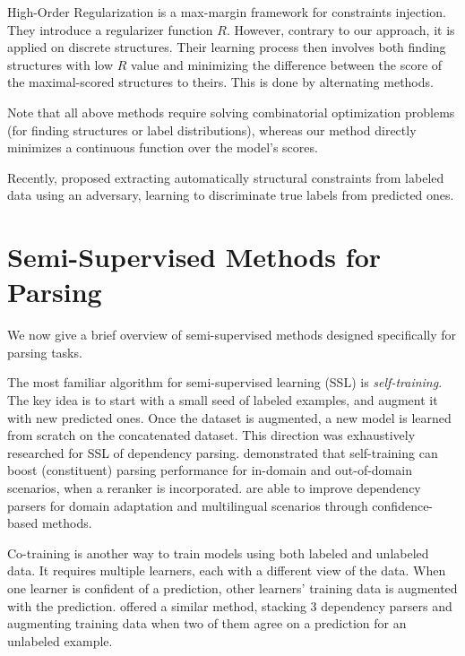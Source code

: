 High-Order Regularization \cite{li_high_2014} is a max-margin framework for constraints injection. They introduce a regularizer function $R$. However, contrary to our approach, it is applied on discrete structures. Their learning process then involves both finding structures with low $R$ value and minimizing the difference between the score of the maximal-scored structures to theirs. This is done by alternating methods.

Note that all above methods require solving combinatorial optimization problems (for finding structures or label distributions), whereas our method directly minimizes a continuous function over the model's scores.

Recently, \cite{ren_structured_nodate} proposed extracting automatically structural constraints from labeled data using an adversary, learning to discriminate true labels from predicted ones.

\section{Semi-Supervised Methods for  Parsing}

We now give a brief overview of semi-supervised methods designed specifically for parsing tasks.

The most familiar algorithm for semi-supervised learning (SSL) is \textit{self-training}. The key idea is to start with a small seed of labeled examples, and augment it with new predicted ones. Once the dataset is augmented, a new model is learned from  scratch on the concatenated dataset. This direction was exhaustively researched for SSL of dependency parsing. \cite{mcclosky_effective_2006,mcclosky_reranking_2006} demonstrated that self-training can boost (constituent) parsing performance for in-domain and out-of-domain scenarios, when a reranker is incorporated. \cite{yu_domain_2015,yu_exploring_2015} are able to improve dependency parsers  for domain adaptation and multilingual scenarios through confidence-based methods.

Co-training \cite{blum_combining_1998} is another way to train models using both labeled and unlabeled data. It requires multiple learners, each with a different view of the data. When one learner is confident of a prediction, other learners' training data is augmented with the prediction. \cite{sogaard_semi-supervised_2010} offered a similar method, stacking 3 dependency parsers and augmenting training data when two of them agree on a prediction for an unlabeled example. 

